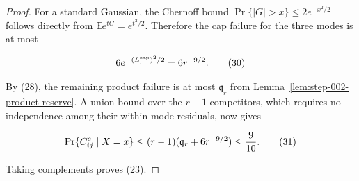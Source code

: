 \begin{proposition}
\begin{proof}
For a standard Gaussian, the Chernoff bound
$\Pr\{|G|>x\}\le2e^{-x^2/2}$ follows directly from
$\mathbb Ee^{tG}=e^{t^2/2}$. Therefore the cap failure for the three
modes is at most

\[
6e^{-(L_r^{\rm cap})^2/2}=6r^{-9/2}.
\tag{30}
\]

By (28), the remaining product failure is at most $\mathfrak q_r$ from
Lemma~\ref{lem:step-002-product-reserve}. A union bound over the $r-1$
competitors, which requires no independence among their within-mode
residuals, now gives

\[
\Pr\{C_{ij}^c\mid X=x\}
\le(r-1)(\mathfrak q_r+6r^{-9/2})
\le {9\over10}.
\tag{31}
\]

Taking complements proves (23). 


\end{proof}
\end{proposition}

